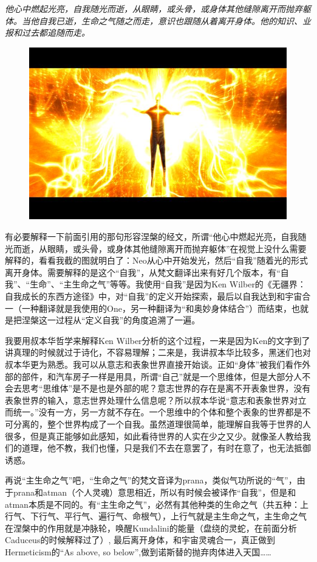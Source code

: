 \documentclass[UTF8]{ctexart}
\begin{document}
{\it 他心中燃起光亮，自我随光而逝，从眼睛，或头骨，或身体其他缝隙离开而抛弃躯体。当他自我已逝，生命之气随之而走，意识也跟随从着离开身体。他的知识、业报和过去都追随而走。}

\begin{figure}[htb]
\centering
\includegraphics[width=0.5\linewidth]{fig/c18537d1d1f7413b9a502724.jpg}
\end{figure}

有必要解释一下前面引用的那句形容涅槃的经文，所谓“他心中燃起光亮，自我随光而逝，从眼睛，或头骨，或身体其他缝隙离开而抛弃躯体”在视觉上没什么需要解释的，看看我截的图就明白了：Neo从心中开始发光，然后“自我”随着光的形式离开身体。需要解释的是这个“自我”，从梵文翻译出来有好几个版本，有“自我”、“生命”、“主生命之气”等等。我使用“自我”是因为Ken Wilber的《无疆界：自我成长的东西方途径》中，对“自我”的定义开始探索，最后以自我达到和宇宙合一（一种翻译就是我使用的One，另一种翻译为“和奥妙身体结合”）而结束，也就是把涅槃这一过程从“定义自我”的角度追溯了一遍。

我要用叔本华哲学来解释Ken Wilber分析的这个过程，一来是因为Ken的文字到了讲真理的时候就过于诗化，不容易理解；二来是，我讲叔本华比较多，黑迷们也对叔本华更为熟悉。我可以从意志和表象世界直接开始谈。正如“身体”被我们看作外部的部件，和汽车房子一样是用具，所谓“自己”就是一个思维体，但是大部分人不会去思考“思维体”是不是也是外部的呢？意志世界的存在是离不开表象世界，没有表象世界的输入，意志世界处理什么信息呢？所以叔本华说“意志和表象世界对立而统一。”没有一方，另一方就不存在。一个思维中的个体和整个表象的世界都是不可分离的，整个世界构成了一个自我。虽然道理很简单，能理解自我等于世界的人很多，但是真正能够如此感知，如此看待世界的人实在少之又少。就像圣人教给我们的道理，他不教，我们也懂，只是我们不去在意罢了，有时在意了，也无法抵御诱惑。

再说“主生命之气”吧，“生命之气”的梵文音译为prana，类似气功所说的“气”，由于prana和atman（个人灵魂）意思相近，所以有时候会被译作“自我”，但是和atman本质是不同的。有“主生命之气”，必然有其他种类的生命之气（共五种：上行气、下行气、平行气、遍行气、命根气），上行气就是主生命之气，主生命之气在涅槃中的作用就是冲脉轮，唤醒Kundalini的能量（盘绕的灵蛇，在前面分析Caduceus的时候解释过了）, 最后离开身体，和宇宙灵魂合一，真正做到Hermeticism的“As above, so below”,做到诺斯替的抛弃肉体进入天国……
\end{document}

